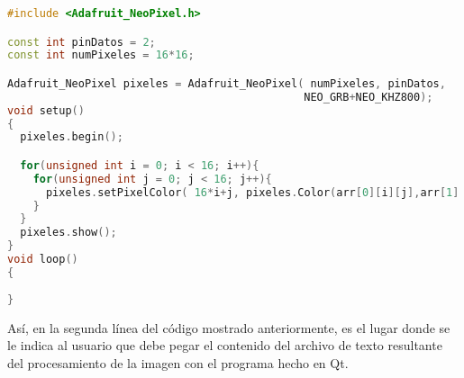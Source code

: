 \documentclass{article}
\begin{document}
\begin{lstlisting}[language=C++, label=final_tinker]
#include <Adafruit_NeoPixel.h>

const int pinDatos = 2;
const int numPixeles = 16*16;

Adafruit_NeoPixel pixeles = Adafruit_NeoPixel( numPixeles, pinDatos,
                                              NEO_GRB+NEO_KHZ800);
void setup()
{
  pixeles.begin();

  for(unsigned int i = 0; i < 16; i++){
    for(unsigned int j = 0; j < 16; j++){
      pixeles.setPixelColor( 16*i+j, pixeles.Color(arr[0][i][j],arr[1][i][j],arr[2][i][j]));
    }
  }
  pixeles.show();
}
void loop()
{
  
}
\end{lstlisting}
Así, en la segunda línea del código mostrado anteriormente, es el lugar donde se le indica al usuario que debe pegar el contenido del archivo de texto resultante del procesamiento de la imagen con el programa hecho en Qt.
\end{document}
